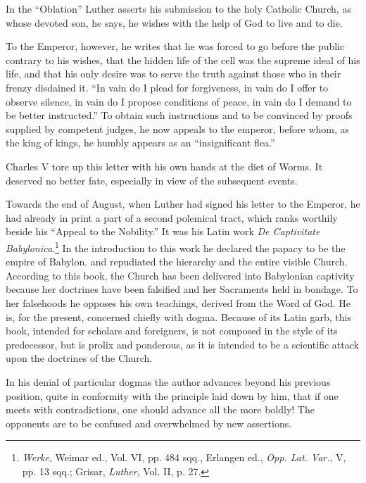 In the “Oblation” Luther asserts his submission to the holy Catholic
Church, as whose devoted son, he says, he wishes with the help of God to
live and to die.

To the Emperor, however, he writes that he was forced to go before the
public contrary to his wishes, that the hidden life of the cell was the supreme
ideal of his life, and that his only desire was to serve the truth against those
who in their frenzy disdained it. “In vain do I plead for forgiveness, in vain
do I offer to observe silence, in vain do I propose conditions of peace, in vain
do I demand to be better instructed.” To obtain such instructions and to
be convinced by proofs supplied by competent judges, he now appeals to
the emperor, before whom, as the king of kings, he humbly appears as an
“insignificant flea.”

Charles V tore up this letter with his own hands at the diet of
Worms. It deserved no better fate, especially in view of the subsequent
events.

Towards the end of August, when Luther had signed his letter to
the Emperor, he had already in print a part of a second polemical
tract, which ranks worthily beside his “Appeal to the Nobility.” It
was his Latin work \textit{De Captivitate Babylonica}.\footnote
{\textit{Werke}, Weimar ed., Vol. VI, pp. 484 sqq., Erlangen ed., \textit{Opp. Lat. Var.}, V, pp. 13 sqq.;
Grisar, \textit{Luther}, Vol. II, p. 27.}
In the introduction
to this work he declared the papacy to be the empire of Babylon. and
repudiated the hierarchy and the entire visible Church. According to
this book, the Church has been delivered into Babylonian captivity
because her doctrines have been falsified and her Sacraments held in
bondage. To her falsehoods he opposes his own teachings, derived
from the Word of God. He is, for the present, concerned chiefly with
dogma. Because of its Latin garb, this book, intended for scholars
and foreigners, is not composed in the style of its predecessor, but is
prolix and ponderous, as it is intended to be a scientific attack upon
the doctrines of the Church.

In his denial of particular dogmas the author advances beyond his
previous position, quite in conformity with the principle laid down
by him, that if one meets with contradictions, one should advance
all the more boldly! The opponents are to be confused and overwhelmed
by new assertions.

